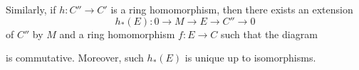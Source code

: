 \documentclass[../main]{subfiles}
\begin{document}
Similarly, if $h:C''\longrightarrow C'$ is a ring homomorphism, then there exists an extension \[h_*(E):0\longrightarrow M\longrightarrow E\longrightarrow C''\longrightarrow0\] of $C''$ by $M$ and a ring homomorphism $f:E\longrightarrow C$ such that the diagram
\begin{center}
\end{center}
is commutative. Moreover, such $h_*(E)$ is unique up to isomorphisms.
\end{document}
